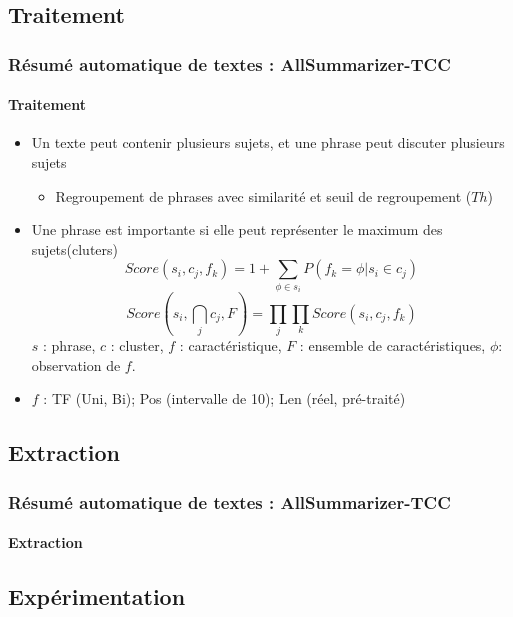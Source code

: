 \documentclass[xcolor=table]{beamer}
\begin{document}
\subsection{Traitement}

\begin{frame}
\frametitle{Résumé automatique de textes : AllSummarizer-TCC}
\framesubtitle{Traitement}
	
	\begin{itemize}
		\item Un texte peut contenir plusieurs sujets, et une phrase peut discuter plusieurs sujets
		\begin{itemize}
			\item Regroupement de phrases avec similarité et seuil de regroupement ($Th$)
		\end{itemize}
		\item Une phrase est importante si elle peut représenter le maximum des sujets(cluters)
		\[ Score(s_i , c_j , f_k ) = 1 + \sum_{\phi \in s_i} {P(f_k=\phi | s_i \in c_j)} \]
		\[ Score(s_i , \bigcap_{j} c_j , F) =  %
		\prod_{j} \prod_{k} Score(s_i , c_j , f_k ) \]
		$ s $ : phrase, $ c $ : cluster, $ f $ : caractéristique, $ F $ : ensemble de caractéristiques, $ \phi $: observation de $ f $.
		\item $f$ : TF (Uni, Bi); Pos (intervalle de 10); Len (réel, pré-traité)
	\end{itemize}
	
\end{frame}

\subsection{Extraction}

\begin{frame}
\frametitle{Résumé automatique de textes : AllSummarizer-TCC}
\framesubtitle{Extraction}
	
	
\end{frame}

\subsection{Expérimentation} 
\end{document}
